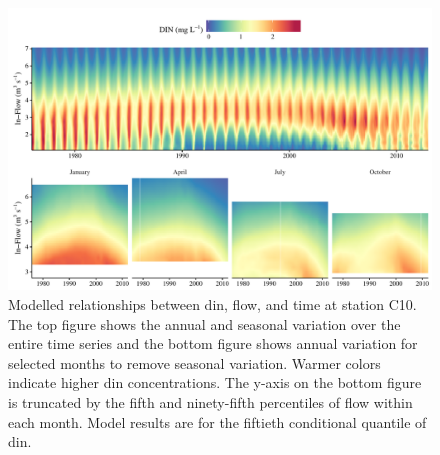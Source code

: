 \documentclass[letterpaper,12pt,oneside]{article}\usepackage[]{graphicx}\usepackage[]{color}
\begin{document}
\begin{figure}[!ht]

{\centering \includegraphics[width=\textwidth]{figs/dinc10dyna-1} 

}

\caption{Modelled relationships between \ac{din}, flow, and time at station C10.  The top figure shows the annual and seasonal variation over the entire time series and the bottom figure shows annual variation for selected months to remove seasonal variation.  Warmer colors indicate higher \ac{din} concentrations.  The y-axis on the bottom figure is truncated by the fifth and ninety-fifth percentiles of flow within each month.  Model results are for the fiftieth conditional quantile of \ac{din}.}\label{fig:dinc10dyna}
\end{figure}
\end{document}
